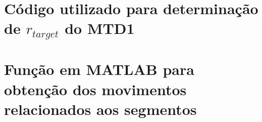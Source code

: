 \begin{apendicesenv}
\chapter{Código utilizado para determinação de $r_{target}$ do MTD1}
\label{ap:r_target}

\chapter{Função em MATLAB para obtenção dos movimentos relacionados aos segmentos}
\label{ap:idMoves}

\end{apendicesenv}


